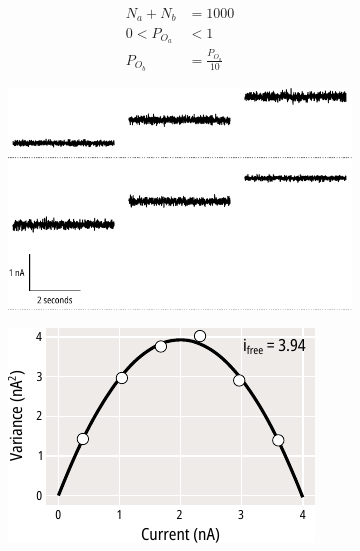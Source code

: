 \begin{equation}\label{eq:bibi_sim}
\begin{split}
	N_a + N_b &= 1000 \\
	0 < P_{O_{a}} &< 1 \\
	P_{O_{b}} &= \frac{P_{O_{a}}}{10}
\end{split}
\end{equation}

\begin{figure}[h]
	\centering
	\begin{subfigure}[t]{0.3\textwidth}
		\caption{}\label{ch4fig:simulated_noise_1}
		\centering
		\includegraphics[width=\textwidth]{simulated_noise_1.pdf}
	\end{subfigure}
	\hfill
	\begin{subfigure}[t]{0.3\textwidth}
		\caption{}\label{ch4fig:simulated_noise_2}
		\centering
		\includegraphics[width=\textwidth]{simulated_noise_2.pdf}

\end{subfigure}
\end{figure}
